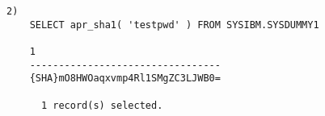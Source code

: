 \documentclass[11pt,a4paper]{article}
\begin{document}
\begin{appendix}
\begin{verbatim}
2)
    SELECT apr_sha1( 'testpwd' ) FROM SYSIBM.SYSDUMMY1

    1
    ---------------------------------
    {SHA}mO8HWOaqxvmp4Rl1SMgZC3LJWB0=

      1 record(s) selected.
\end{verbatim}

\end{appendix}
\end{document}
